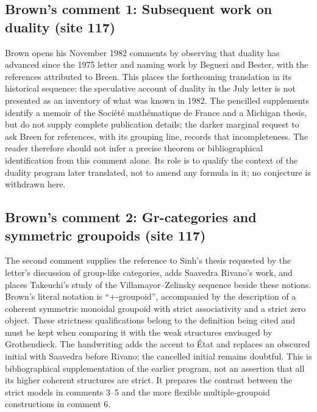 \subsection*{Brown's comment 1: Subsequent work on duality (site 117)}
Brown opens his November 1982 comments by observing that duality has advanced since the 1975 letter and naming work by Begueri and Bester, with the references attributed to Breen. This places the forthcoming translation in its historical sequence: the speculative account of duality in the July letter is not presented as an inventory of what was known in 1982. The pencilled supplements identify a memoir of the Société mathématique de France and a Michigan thesis, but do not supply complete publication details; the darker marginal request to ask Breen for references, with its grouping line, records that incompleteness. The reader therefore should not infer a precise theorem or bibliographical identification from this comment alone. Its role is to qualify the context of the duality program later translated, not to amend any formula in it; no conjecture is withdrawn here.

\subsection*{Brown's comment 2: Gr-categories and symmetric groupoids (site 117)}
The second comment supplies the reference to Sinh's thesis requested by the letter's discussion of group-like categories, adds Saavedra Rivano's work, and places Takeuchi's study of the Villamayor--Zelinsky sequence beside these notions. Brown's literal notation is ``+-groupoid'', accompanied by the description of a coherent symmetric monoidal groupoid with strict associativity and a strict zero object. These strictness qualifications belong to the definition being cited and must be kept when comparing it with the weak structures envisaged by Grothendieck. The handwriting adds the accent to État and replaces an obscured initial with Saavedra before Rivano; the cancelled initial remains doubtful. This is bibliographical supplementation of the earlier program, not an assertion that all its higher coherent structures are strict. It prepares the contrast between the strict models in comments 3--5 and the more flexible multiple-groupoid constructions in comment 6.


